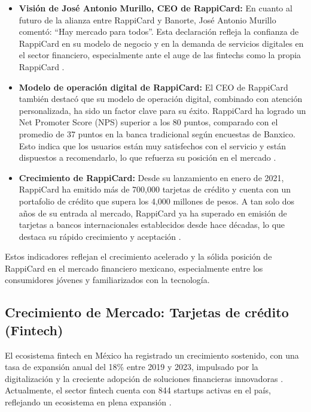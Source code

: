 \begin{itemize}
    \item \textbf{Visión de José Antonio Murillo, CEO de RappiCard:} En cuanto al futuro de la alianza entre RappiCard y Banorte, José Antonio Murillo comentó: “Hay mercado para todos”. Esta declaración refleja la confianza de RappiCard en su modelo de negocio y en la demanda de servicios digitales en el sector financiero, especialmente ante el auge de las fintechs como la propia RappiCard \cite{forbesrappibanorte}.
    \item \textbf{Modelo de operación digital de RappiCard:} El CEO de RappiCard también destacó que su modelo de operación digital, combinado con atención personalizada, ha sido un factor clave para su éxito. RappiCard ha logrado un Net Promoter Score (NPS) superior a los 80 puntos, comparado con el promedio de 37 puntos en la banca tradicional según encuestas de Banxico. Esto indica que los usuarios están muy satisfechos con el servicio y están dispuestos a recomendarlo, lo que refuerza su posición en el mercado \cite{forbesrappibanorte}.
    \item \textbf{Crecimiento de RappiCard:} Desde su lanzamiento en enero de 2021, RappiCard ha emitido más de 700,000 tarjetas de crédito y cuenta con un portafolio de crédito que supera los 4,000 millones de pesos. A tan solo dos años de su entrada al mercado, RappiCard ya ha superado en emisión de tarjetas a bancos internacionales establecidos desde hace décadas, lo que destaca su rápido crecimiento y aceptación \cite{forbesrappibanorte}.
\end{itemize}

Estos indicadores reflejan el crecimiento acelerado y la sólida posición de RappiCard en el mercado financiero mexicano, especialmente entre los consumidores jóvenes y familiarizados con la tecnología.

\subsection*{Crecimiento de Mercado: Tarjetas de crédito (Fintech)}
El ecosistema fintech en México ha registrado un crecimiento sostenido, con una tasa de expansión anual del 18\% entre 2019 y 2023, impulsado por la digitalización y la creciente adopción de soluciones financieras innovadoras \cite{dock2024}. Actualmente, el sector fintech cuenta con 844 startups activas en el país, reflejando un ecosistema en plena expansión \cite{finnovating2024}.

\vspace{0.3cm}

